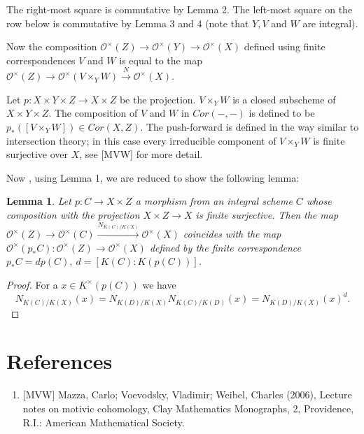 \documentclass{article}
\theoremstyle{theorem}
\newtheorem{lemma}[theorem]{Lemma}
\theoremstyle{definition}
\begin{document}
    The right-most square is commutative by Lemma 2. The left-most square on the row below is commutative by Lemma 3 and 4 (note that $Y, V$ and $W$ are integral).
    
    Now the composition $\mathcal O^\times(Z) \rightarrow \mathcal O^\times(Y) \rightarrow \mathcal O^\times(X)$ defined using finite correspondences $V$ and $W$ is equal to the map $\mathcal O^\times(Z) \rightarrow \mathcal O^\times(V\times_YW) \xrightarrow{N} \mathcal O^\times(X)$.
    
    Let $p : X \times Y \times Z \rightarrow X \times Z$ be the projection. $V \times_Y W$ is a closed subscheme of $X \times Y \times Z$. The composition of $V$ and $W$ in $Cor(-, -)$ is defined to be $p_*([V\times_Y W]) \in Cor(X, Z).$ The push-forward is defined in the way similar to intersection theory; in this case every irreducible component of $V\times_Y W$ is finite surjective over $X$, see [MVW] for more detail.
    
    Now , using Lemma 1, we are reduced to show the following lemma:
    
    \begin{lemma}
        Let $p : C \rightarrow X \times Z$ a morphism from an integral scheme $C$ whose composition with the projection $X \times Z \rightarrow X$ is finite surjective. Then the map $\mathcal O^\times(Z) \rightarrow \mathcal O^\times(C) \xrightarrow{N_{K(C)/K(X)}} \mathcal O^\times(X)$ coincides with the map $\mathcal O^\times(p_*C) : \mathcal O^\times(Z) \rightarrow \mathcal O^\times(X)$ defined by the finite correspondence $p_*C = dp(C),\ d = [K(C) : K(p(C))]$.
    \end{lemma}
    \begin{proof}
        For a $x \in K^\times(p(C))$ we have
        $$N_{K(C)/K(X)}(x) = N_{K(D)/K(X)}N_{K(C)/K(D)}(x) = N_{K(D)/K(X)}(x)^d.$$
    \end{proof}
    
    \section*{References}
    \begin{enumerate}[]
        \item {[MVW]} Mazza, Carlo; Voevodsky, Vladimir; Weibel, Charles (2006), Lecture notes on motivic cohomology, Clay Mathematics Monographs, 2, Providence, R.I.: American Mathematical Society.
    \end{enumerate}
\end{document}
